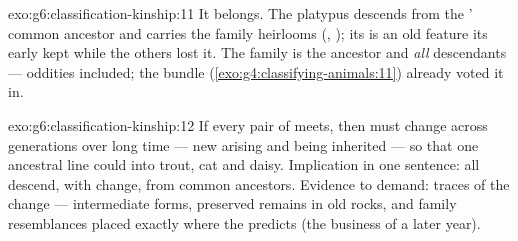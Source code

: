 \begin{solution}{exo:g6:classification-kinship:11}
It belongs. The platypus descends from the ' common
ancestor and carries the family heirlooms (, ); its
 is an old feature its early  kept while the
others lost it. The family is the ancestor and \emph{all}
descendants --- oddities included; the bundle
(\cref{exo:g4:classifying-animals:11}) already voted it in.
\end{solution}

\begin{solution}{exo:g6:classification-kinship:12}
If every pair of  meets, then  must change
across generations over long time --- new 
arising and being inherited --- so that one ancestral line
could  into trout, cat and daisy. Implication in one
sentence: all  descend, with change, from
common ancestors. Evidence to demand: traces of the change
--- intermediate forms, preserved remains in old rocks,
and family resemblances placed exactly where the 
predicts (the business of a later year).
\end{solution}

